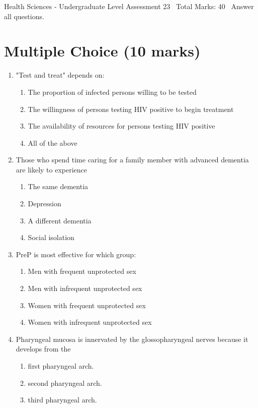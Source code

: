 \documentclass[12pt]{article}
\begin{document}
\begin{center}
Health Sciences - Undergraduate Level Assessment 23 \
Total Marks: 40 \
Answer all questions.
\end{center}

\section*{Multiple Choice (10 marks)}
\begin{enumerate}[label=\arabic*.]
\item "Test and treat" depends on:
\begin{enumerate}[label=(\alph*)]
    \item The proportion of infected persons willing to be tested
    \item The willingness of persons testing HIV positive to begin treatment
    \item The availability of resources for persons testing HIV positive
    \item All of the above
\end{enumerate}
\item Those who spend time caring for a family member with advanced dementia are likely to experience
\begin{enumerate}[label=(\alph*)]
    \item The same dementia
    \item Depression
    \item A different dementia
    \item Social isolation
\end{enumerate}
\item PreP is most effective for which group:
\begin{enumerate}[label=(\alph*)]
    \item Men with frequent unprotected sex
    \item Men with infrequent unprotected sex
    \item Women with frequent unprotected sex
    \item Women with infrequent unprotected sex
\end{enumerate}
\item Pharyngeal mucosa is innervated by the glossopharyngeal nerves because it develops from the
\begin{enumerate}[label=(\alph*)]
    \item first pharyngeal arch.
    \item second pharyngeal arch.
    \item third pharyngeal arch.

\end{enumerate}
\end{enumerate}
\end{document}
